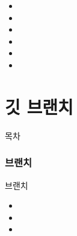 \documentclass[aspectratio=1610,20pt,xcolor=pdftex,dvipsnames,table,handout]{beamer}
\begin{document}
		\begin{frame} [t,plain]
			\begin{block} {}
			\setlength{\leftmargini}{2em}			
			\begin{itemize}
				\item 
				\item 
				\item 
				\item 
				\item 
				\item 
			\end{itemize}
			\end{block}						
		\end{frame}			



		\part{깃 브랜치 }
		\frame{\partpage}


\label{part1} 	%


		\begin{frame} [plain]{목차}
		\tableofcontents%
		\end{frame}

		\section{브랜치}
		\begin{frame} [t,plain]
			\begin{block} {브랜치}
			\setlength{\leftmargini}{2em}			
			\begin{itemize}
				\item 
				\item 
				\item 
			\end{itemize}
			\end{block}						
		\end{frame}						
\end{document}
